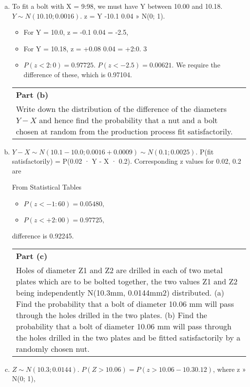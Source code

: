 \documentclass[a4paper,12pt]{article}
\begin{document}
\begin{enumerate}[(a)]
\item To fit a bolt with X = 9:98, we must have Y between 10.00 and 10.18.
$Y \sim N(10.10; 0.0016)$. z = Y -10.1
0.04 » N(0; 1).
\begin{itemize}
    \item For Y = 10.0, z = -0.1
0.04 = -2.5,
\item For Y = 10.18, z = +0.08
0.04 = +2:0.
3
\item $P(z < 2:0) = 0.97725$. $P(z < -2.5) = 0.00621$.
We require the difference of these, which is 0.97104.
\end{itemize}

  \begin{table}[ht!]
     \centering
     \begin{tabular}{|p{15cm}|}
     \hline  
\noindent \textbf{Part (b)}\\Write down the distribution of the difference of the diameters $Y - X$ and hence find the probability that a nut and a bolt chosen at random from the production process fit satisfactorily.
\\ \hline
      \end{tabular}
    \end{table}
    
\item  $Y - X \sim N(10.1 - 10.0; 0.0016 + 0.0009) \sim N(0.1; 0.0025).$
P(fit satisfactorily) = P(0.02 · Y - X · 0.2). Corresponding z values for
0.02, 0.2 are 
From Statistical Tables

\begin{itemize}
\item $P(z < -1:60) = 0.05480,$
\item $P(z < +2:00) = 0.97725,$
\end{itemize}
difference is 0.92245.
\newpage
 \begin{table}[ht!]
\centering
\begin{tabular}{|p{15cm}|}
\hline  
\noindent \textbf{Part (c)}\\ Holes of diameter Z1 and Z2 are drilled in each of two metal plates which
are to be bolted together, the two values Z1 and Z2 being independently N(10.3mm, 0.0144mm2) distributed.
(a) Find the probability that a bolt of diameter 10.06 mm will pass through the holes drilled in the two plates.
(b) Find the probability that a bolt of diameter 10.06 mm will pass through the holes drilled in the two plates and be fitted satisfactorily by a randomly chosen nut. \\ \hline 
\end{tabular}
\end{table}
\item  $Z \sim N(10.3; 0.0144)$. $P(Z > 10.06) = P(z > 10.06-10.3
0.12 )$, where z » N(0; 1),


\end{enumerate}
\end{document}
